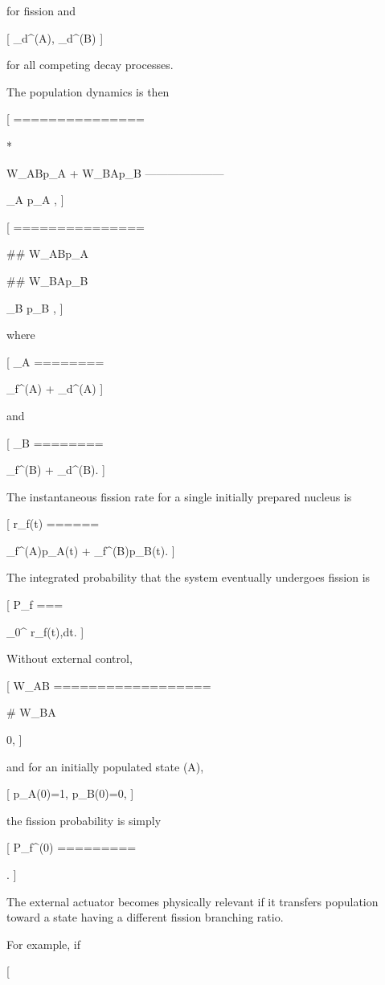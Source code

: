 for fission and

[
\Gamma_d^{(A)},\qquad
\Gamma_d^{(B)}
]

for all competing decay processes.

The population dynamics is then

[
===============

*

W_{A\rightarrow B}p_A
+
W_{B\rightarrow A}p_B
---------------------

\Gamma_A p_A ,
]

[
===============

## W_{A\rightarrow B}p_A

## W_{B\rightarrow A}p_B

\Gamma_B p_B ,
]

where

[
\Gamma_A
========

\Gamma_f^{(A)}
+
\Gamma_d^{(A)}
]

and

[
\Gamma_B
========

\Gamma_f^{(B)}
+
\Gamma_d^{(B)}.
]

The instantaneous fission rate for a single initially prepared nucleus is

[
r_f(t)
======

\Gamma_f^{(A)}p_A(t)
+
\Gamma_f^{(B)}p_B(t).
]

The integrated probability that the system eventually undergoes fission is

[
P_f
===

\int_0^\infty
r_f(t),dt.
]

Without external control,

[
W_{A\rightarrow B}
==================

# W_{B\rightarrow A}

0,
]

and for an initially populated state (A),

[
p_A(0)=1,
\qquad
p_B(0)=0,
]

the fission probability is simply

[
P_f^{(0)}
=========

.
]

The external actuator becomes physically relevant if it transfers population toward a state having a different fission branching ratio.

For example, if

[

